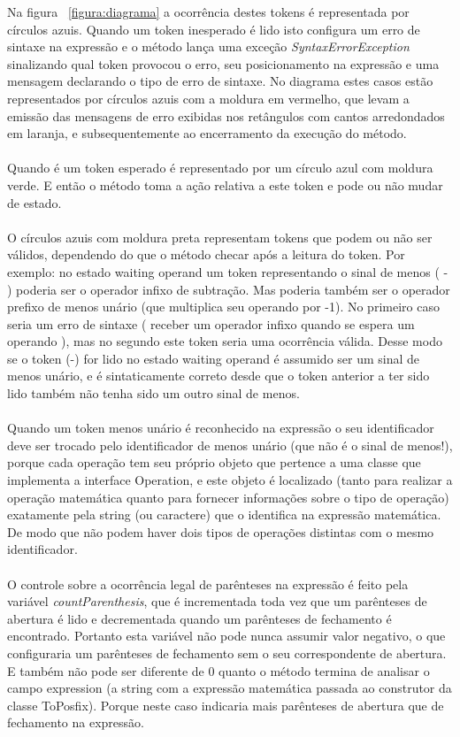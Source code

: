 \documentclass[a4paper,12pt,openany]{book}
\begin{document}
Na figura ~\ref{figura:diagrama} a ocorrência destes tokens é representada por círculos azuis. Quando um token inesperado é lido isto configura um erro de sintaxe na expressão e o método lança uma exceção \textit{SyntaxErrorException} sinalizando qual token provocou o erro, seu posicionamento na expressão e uma mensagem declarando o tipo de erro de sintaxe. No diagrama estes casos estão representados por círculos azuis com a moldura em vermelho, que levam a emissão das mensagens de erro exibidas nos retângulos com cantos arredondados em laranja, e subsequentemente ao encerramento da execução do método.
\\
\\
Quando é um token esperado é representado por um círculo azul com moldura verde. E então o método toma a ação relativa a este token e pode ou não mudar de estado.
\\
\\
O círculos azuis com moldura preta representam tokens que podem ou não ser válidos, dependendo do que o método checar após a leitura do token. Por exemplo: no estado waiting operand um token representando o sinal de menos ( - ) poderia ser o operador infixo de subtração. Mas poderia também ser o operador prefixo de menos unário (que multiplica seu operando por -1). No primeiro caso seria um erro de sintaxe ( receber um operador infixo quando se espera um operando ), mas no segundo este token seria uma ocorrência válida.
Desse modo se o token (-) for lido no estado waiting operand é assumido ser um sinal de menos unário, e é sintaticamente correto desde que o token anterior a ter sido lido também não tenha sido um outro sinal de menos.
\\
\\
Quando um token menos unário é reconhecido na expressão o seu identificador deve ser trocado pelo identificador de menos unário (que não é o sinal de menos!), porque cada operação tem seu próprio objeto que pertence a uma classe que implementa a interface Operation, e este objeto é localizado (tanto para realizar a operação matemática quanto para fornecer informações sobre o tipo de operação) exatamente pela string (ou caractere) que o identifica na expressão matemática. De modo que não podem haver dois tipos de operações distintas com o mesmo identificador.
\\
\\
O controle sobre a ocorrência legal de parênteses na expressão é feito pela variável \textit{countParenthesis}, que é incrementada toda vez que um parênteses de abertura é lido e decrementada quando um parênteses de fechamento é encontrado. Portanto esta variável não pode nunca assumir valor negativo, o que configuraria um parênteses de fechamento sem o seu correspondente de abertura. E também não pode ser diferente de 0 quanto o método termina de analisar o campo expression (a string com a expressão matemática passada ao construtor da classe ToPosfix). Porque neste caso indicaria mais parênteses de abertura que de fechamento na expressão.
\end{document}
